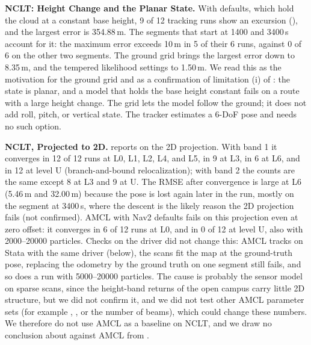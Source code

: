 \noindent\textbf{NCLT: Height Change and the Planar State.} With  defaults, which hold the cloud at a constant base height, 9 of 12 tracking runs show an excursion (), and the largest error is 354.88\,m. The segments that start at 1400 and 3400\,s account for it: the maximum error exceeds 10\,m in 5 of their 6 runs, against 0 of 6 on the other two segments. The ground grid brings the largest error down to 8.35\,m, and the tempered likelihood settings to 1.50\,m. We read this as the motivation for the ground grid and as a confirmation of limitation (i) of : the state is planar, and a model that holds the base height constant fails on a route with a large height change. The grid lets the model follow the ground; it does not add roll, pitch, or vertical state. The tracker estimates a 6-DoF pose and needs no such option.



\noindent\textbf{NCLT, Projected to 2D.}  reports  on the 2D projection. With band 1 it converges in 12 of 12 runs at L0, L1, L2, L4, and L5, in 9 at L3, in 6 at L6, and in 12 at level U (branch-and-bound relocalization); with band 2 the counts are the same except 8 at L3 and 9 at U. The RMSE after convergence is large at L6 (5.46\,m and 32.00\,m) because the pose is lost again later in the run, mostly on the segment at 3400\,s, where the descent is the likely reason the 2D projection fails (not confirmed). AMCL with Nav2 defaults fails on this projection even at zero offset: it converges in 6 of 12 runs at L0, and in 0 of 12 at level U, also with 2000--20000 particles. Checks on the driver did not change this: AMCL tracks on Stata with the same driver (below), the scans fit the map at the ground-truth pose, replacing the odometry by the ground truth on one segment still fails, and so does a run with 5000--20000 particles. The cause is probably the sensor model on sparse scans, since the height-band returns of the open campus carry little 2D structure, but we did not confirm it, and we did not test other AMCL parameter sets (for example , , or the number of beams), which could change these numbers. We therefore do not use AMCL as a baseline on NCLT, and we draw no conclusion about  against AMCL from .




